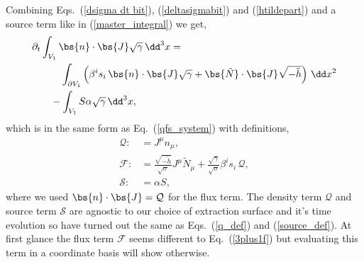Combining Eqs.~(\ref{dsigma dt bit}), (\ref{deltasigmabit}) and (\ref{htildepart}) and a source term like in (\ref{master_integral}) we get,
\begin{align}
 \partial_t &\int_{V_1} \bs{n} \cdot \bs{J} \sqrt{\gamma} \,\dd^3 x =\nonumber \\
 &\quad\quad\int_{\partial V_1} \left( \beta^i s_i\, \bs{n} \cdot \bs{J} \sqrt{\gamma}  + \bs{\tilde N} \cdot \bs{J} \sqrt{-\tilde{h}} \right) \, \dd x^2 \nonumber \\
 &\quad-\int_{V_1} S \alpha \sqrt{\gamma} \, \dd^3 x,
\end{align}
which is in the same form as Eq.~(\ref{qfs_system}) with definitions,
\begin{align}
\mathcal{Q} :&= J^\mu n_\mu, \\
\label{unfinished_flux}\mathcal{F} :&= \frac{\sqrt{-\tilde h}}{\sqrt{\sigma}}J^\mu \tilde N_\mu +  \frac{\sqrt{\gamma}}{\sqrt{\sigma}}\beta^i s_i\, \mathcal{Q} , \\
\mathcal{S} :&= \alpha S,
\end{align} 
where we used $\bs{n} \cdot \bs{J} = \mathcal{Q}$ for the flux term. The density term $\mathcal{Q}$ and source term $\mathcal{S}$ are agnostic to our choice of extraction surface and it's time evolution so have turned out the same as Eqs.~(\ref{q_def}) and (\ref{source_def}). At first glance the flux term $\mathcal{F}$ seems different to Eq.~(\ref{3plus1f}) but evaluating this term in a coordinate basis will show otherwise.


